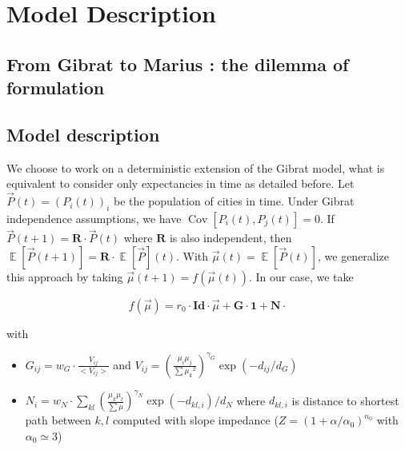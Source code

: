 \documentclass[Royal,sageh,times]{sagej}
\DeclareMathOperator{\Cov}{Cov}
\DeclareMathOperator{\E}{\mathbb{E}}
\newcommand{\Covb}[2]{\ensuremath{\Cov\!\left[#1,#2\right]}}
\newcommand{\Eb}[1]{\ensuremath{\E\!\left[#1\right]}}
\begin{document}
\section{Model Description}




\subsection{From Gibrat to Marius : the dilemma of formulation}





\subsection{Model description}

We choose to work on a deterministic extension of the Gibrat model, what is equivalent to consider only expectancies in time as detailed before. Let $\vec{P}(t)=(P_i(t))_i$ be the population of cities in time. Under Gibrat independence assumptions, we have $\Covb{P_i(t)}{P_j(t)}=0$. If $\vec{P}(t+1)=\mathbf{R}\cdot \vec{P}(t)$ where $\mathbf{R}$ is also independent, then $\Eb{\vec{P}(t+1)}=\mathbf{R}\cdot\Eb{\vec{P}}(t)$. With $\vec{\mu}(t)=\Eb{\vec{P}(t)}$, we generalize this approach by taking $\vec{\mu}(t+1)=f(\vec{\mu}(t))$. In our case, we take

\[f(\vec{\mu}) = r_0\cdot \mathbf{Id}\cdot \vec{\mu} + \mathbf{G}\cdot \mathbf{1} + \mathbf{N}\cdot \]

with 
\begin{itemize}
\item $G_{ij} = w_G\cdot \frac{V_{ij}}{<V_{ij}>}$ and $V_{ij} = \left(\frac{\mu_i\mu_j}{\sum{\mu_k}^2}\right)^{\gamma_G} \exp{(-d_{ij}/d_G)}$
\item $N_{i} = w_N \cdot \sum_{kl} \left(\frac{\mu_k\mu_l}{\sum\mu}\right)^{\gamma_N}\exp{(-d_{kl,i})/d_N}$ where $d_{kl,i}$ is distance to shortest path between $k,l$ computed with slope impedance ($Z=\left(1+\alpha/\alpha_0\right)^{n_0}$ with $\alpha_0\simeq 3$)
\end{itemize}
\end{document}
